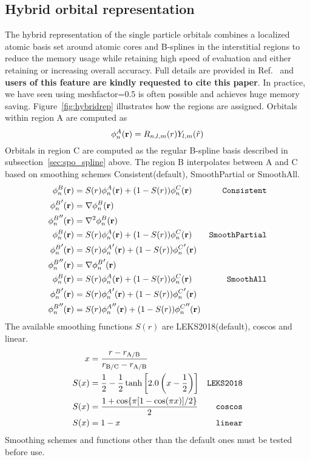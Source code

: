 \subsection{Hybrid orbital representation}
\label{sec:spo_hybrid}
The hybrid representation of the single particle orbitals combines a localized atomic basis set around atomic cores and B-splines in the interstitial regions to reduce the memory usage while retaining high speed of evaluation and either retaining or increasing overall accuracy. Full details are provided in Ref.~\cite{Luo2018hyb} and \textbf{users of this feature are kindly requested to cite this paper}.
In practice, we have seen using meshfactor=0.5 is often possible and achieves huge memory saving.
Figure~\ref{fig:hybridrep} illustrates how the regions are assigned. Orbitals within region A are computed as
\[
  \phi^A_n({\bf r})=R_{n,l,m}(r)Y_{l,m}(\hat{r})
\]
Orbitals in region C are computed as the regular B-spline basis described in subsection~\ref{sec:spo_spline} above. The region B interpolates between A and C based on smoothing schemes Consistent(default), SmoothPartial or SmoothAll.
\begin{align}
  \phi^B_n({\bf r}) & = S(r) \phi^A_n({\bf r}) + (1-S(r))\phi^C_n({\bf r}) & \texttt{Consistent} \\
  {\phi^B_n}'({\bf r}) & = \nabla\phi^B_n({\bf r}) \nonumber \\
  {\phi^B_n}''({\bf r}) & = \nabla^2\phi^B_n({\bf r}) \nonumber \\
  \phi^B_n({\bf r}) & = S(r) \phi^A_n({\bf r}) + (1-S(r))\phi^C_n({\bf r}) & \texttt{SmoothPartial} \\
  {\phi^B_n}'({\bf r}) & = S(r) {\phi^A_n}'({\bf r}) + (1-S(r)){\phi^C_n}'({\bf r}) \nonumber \\
  {\phi^B_n}''({\bf r}) & = \nabla{\phi^B_n}'({\bf r}) \nonumber \\
  \phi^B_n({\bf r}) & = S(r) \phi^A_n({\bf r}) + (1-S(r))\phi^C_n({\bf r}) & \texttt{SmoothAll} \\
  {\phi^B_n}'({\bf r}) & = S(r) {\phi^A_n}'({\bf r}) + (1-S(r)){\phi^C_n}'({\bf r}) \nonumber \\
  {\phi^B_n}''({\bf r}) & = S(r) {\phi^A_n}''({\bf r}) + (1-S(r)){\phi^C_n}''({\bf r}) \nonumber
\end{align}
The available smoothing functions $S(r)$ are LEKS2018(default), coscos and linear.
\begin{align}
                   x &= \frac{r-r_{\rm A/B}}{r_{\rm B/C}-r_{\rm A/B}} & \\
                S(x) &= \frac{1}{2}-\frac{1}{2}\tanh\left[2.0\left(x-\frac{1}{2}\right)\right] & \texttt{LEKS2018} \\
                S(x) &= \frac{1+\cos\{\pi [1-\cos(\pi x)]/2\}}{2} & \texttt{coscos} \\
                S(x) &= 1-x & \texttt{linear}
\end{align}
Smoothing schemes and functions other than the default ones must be tested before use.

